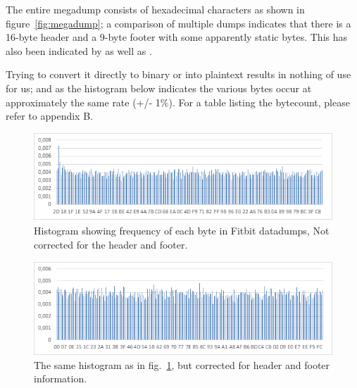 \documentclass[a4paper,11pt,dvips]{article}
\begin{document}
The entire megadump consists of hexadecimal characters as shown in figure~\ref{fig:megadump}; a comparison of multiple dumps indicates that there is a 16-byte header and a 9-byte footer with some apparently static bytes. This has also been indicated by \cite{Allard:2014a} as well as \cite{Aprville:2015b}.

Trying to convert it directly to binary or into plaintext results in nothing of use for us; and as the histogram below indicates the various bytes occur at approximately the same rate (+/- 1\%). For a table listing the bytecount, please refer to appendix B.

\begin{figure}
\noindent
\includegraphics[natwidth=624bp,natheight=184bp,width=\linewidth]{histogram_meta}
\caption{Histogram showing frequency of each byte in Fitbit datadumps, Not corrected for the header and footer.}
\label{fig:histogram_meta}
\end{figure}

\begin{figure}
\noindent
\includegraphics[natwidth=624bp,natheight=195bp,width=\linewidth]{histogram_nometa}
\caption{The same histogram as in fig.~\ref{fig:histogram_meta}, but corrected for header and footer information.}
\label{fig:histogram_nometa}
\end{figure}
\end{document}
